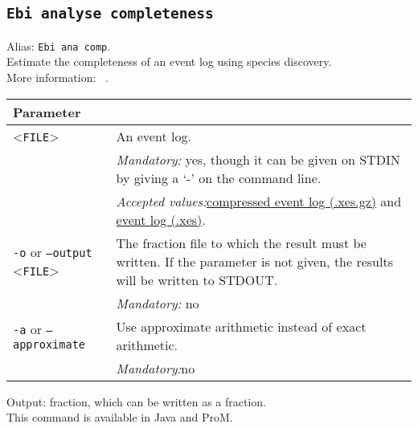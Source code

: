 {\subsection{\texttt{Ebi analyse completeness}}
\label{command:Ebi analyse completeness}
Alias: \texttt{Ebi ana comp}.\\
Estimate the completeness of an event log using species discovery.\\
More information: ~\cite{DBLP:conf/icpm/KabierskiRW23}.\\
\begin{tabularx}{\linewidth}{lX}
\toprule
Parameter \\\midrule
<\texttt{FILE}>&An event log.\\
&\textit{Mandatory:} \quad yes, though it can be given on STDIN by giving a `-' on the command line.\\
&\textit{Accepted values:}\quad \hyperref[filehandler:compressed event log]{compressed event log (.xes.gz)} and \hyperref[filehandler:event log]{event log (.xes)}.\\
\texttt{-o} or \texttt{--output} <\texttt{FILE}> &
The fraction file to which the result must be written. If the parameter is not given, the results will be written to STDOUT.\\
&\textit{Mandatory:} \quad no\\
\texttt{-a} or \texttt{--approximate} & Use approximate arithmetic instead of exact arithmetic.\\
&\textit{Mandatory:}\quad no\\
\bottomrule
\end{tabularx}
\noindent Output: fraction, which can be written as a fraction.
\\This command is available in Java and ProM.
}
